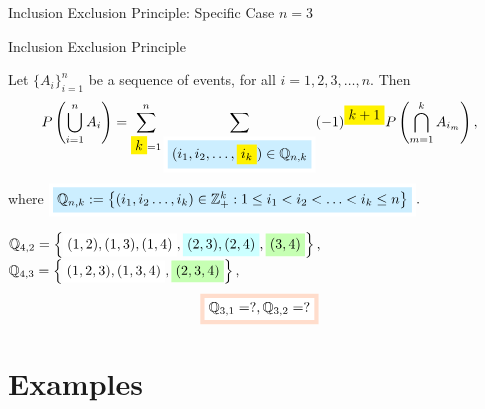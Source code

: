 \documentclass[compress]{beamer}
\begin{document}
\begin{frame}{Inclusion Exclusion Principle: Specific Case  $n=3$}


\end{frame}
\begin{frame}{Inclusion Exclusion Principle}

\begin{lemma}
Let  $\{A_i\}_{i=1}^{n}$ be a sequence of events, for all $i=1, 2, 3, \ldots, n $. Then 
$$  P\left(\bigcup_{i=1}^{n}A_i \right)= \sum_{\HLTY{k}=1}^{n } \sum_{\HLTEQ[white]{\HLTEQ[lightBlueTwo]{(i_1,i_2,\ldots,{\HLTY{i_k}})\in \mathbb{Q}_{n,k}}}} (-1)^{\HLTY{k+1}}P\left(\bigcap_{m=1}^{k} A_{i_m} \right) ,  $$
where   $ \HLTEQ[white]{\HLTEQ[lightBlueTwo]{\mathbb{Q}_{n,k}:= \left\{(i_1, i_2\ldots, i_k)\in \mathbb{Z}_{+}^k: 1\leq i_1<i_2<\ldots<i_{k}\leq n \right\} }}.$ 
\end{lemma}
$\mathbb{Q}_{4, 2}=\left\{   \HLTEQ{(1, 2), (1, 3), (1, 4)},  \HLTEQ[lightBlueOne]{(2, 3), (2, 4)},  \HLTEQ[lightGreenTwo]{(3, 4)}   \right\},$
$\mathbb{Q}_{4, 3}=\left\{   \HLTEQ{(1, 2, 3), (1, 3, 4)},  \HLTEQ[lightGreenTwo]{(2, 3, 4)}\right\},$\\
$$\HLTEQ[lightBrownOne]{ \HLTEQ[white]{  \mathbb{Q}_{3, 1}=?,\mathbb{Q}_{3, 2}=?}}$$



\end{frame}


\section{Examples}



\end{document}
